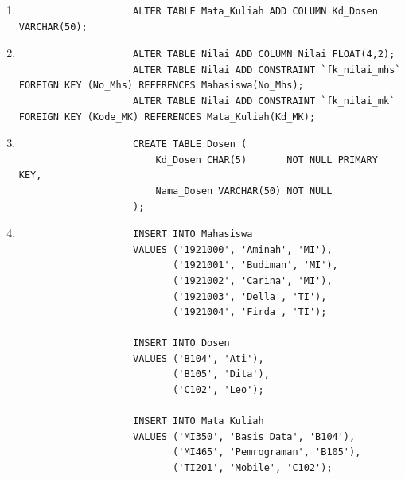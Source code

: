 \documentclass[12pt,titlepage]{article}
\begin{document}
\begin{enumerate}
{\begin{enumerate}[label=\alph*.]
{\begin{verbatim}
                    ALTER TABLE Mahasiswa ADD COLUMN Jurusan VARCHAR(50);
                \end{verbatim}
            }
            \item {
                \begin{verbatim}
                    ALTER TABLE Mata_Kuliah ADD COLUMN Kd_Dosen VARCHAR(50);
                \end{verbatim}
            }
            \item {
                \begin{verbatim}
                    ALTER TABLE Nilai ADD COLUMN Nilai FLOAT(4,2);
                    ALTER TABLE Nilai ADD CONSTRAINT `fk_nilai_mhs` FOREIGN KEY (No_Mhs) REFERENCES Mahasiswa(No_Mhs);
                    ALTER TABLE Nilai ADD CONSTRAINT `fk_nilai_mk` FOREIGN KEY (Kode_MK) REFERENCES Mata_Kuliah(Kd_MK);
                \end{verbatim}
            }
            \item {
                \begin{verbatim}
                    CREATE TABLE Dosen (
                        Kd_Dosen CHAR(5)       NOT NULL PRIMARY KEY,
                        Nama_Dosen VARCHAR(50) NOT NULL
                    );
                \end{verbatim}
            }
            \item {
                \begin{verbatim}
                    INSERT INTO Mahasiswa
                    VALUES ('1921000', 'Aminah', 'MI'),
                           ('1921001', 'Budiman', 'MI'),
                           ('1921002', 'Carina', 'MI'),
                           ('1921003', 'Della', 'TI'),
                           ('1921004', 'Firda', 'TI');

                    INSERT INTO Dosen
                    VALUES ('B104', 'Ati'),
                           ('B105', 'Dita'),
                           ('C102', 'Leo');

                    INSERT INTO Mata_Kuliah
                    VALUES ('MI350', 'Basis Data', 'B104'),
                           ('MI465', 'Pemrograman', 'B105'),
                           ('TI201', 'Mobile', 'C102');


\end{verbatim}}
\end{enumerate}}
\end{enumerate}
\end{document}

